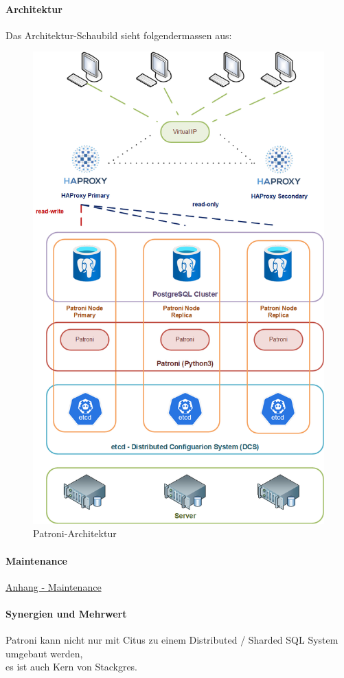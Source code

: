 \begin{flushleft}
    \paragraph{Architektur}
    Das Architektur-Schaubild sieht folgendermassen aus:
    \begin{figure}[H]
        \centering
        \includegraphics[width=0.75\linewidth]{source/implementation/evaluation/postgresql_ha_solutions/patroni_architecture}
        \caption{Patroni-Architektur}
        \label{fig:patroni-architecture}
    \end{figure}
\end{flushleft}
\begin{flushleft}
    \paragraph{Maintenance}
    \hyperref[subsec:maintenance_patroni]{Anhang - Maintenance}
\end{flushleft}
\begin{flushleft}
    \paragraph{Synergien und Mehrwert}
    Patroni kann nicht nur mit Citus zu einem Distributed / Sharded SQL System umgebaut werden,\\
    es ist auch Kern von Stackgres.
\end{flushleft}
